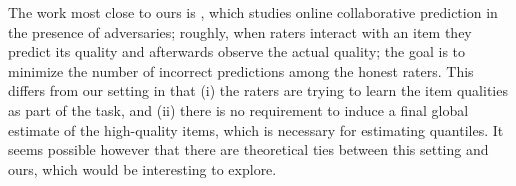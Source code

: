 
The work most close to ours is , which studies online collaborative prediction in 
the presence of adversaries; roughly, when raters interact with an item 
they predict its quality and afterwards observe the actual quality; the 
goal is to minimize the number of incorrect 
predictions among the honest raters. This differs from our setting in that 
(i) the raters are trying to learn the item qualities as part of the task, 
and (ii) there is no requirement to induce a final global estimate of the 
high-quality items, which is necessary for estimating quantiles.
It seems possible however that there are theoretical ties between this 
setting and ours, which would be interesting to explore.
